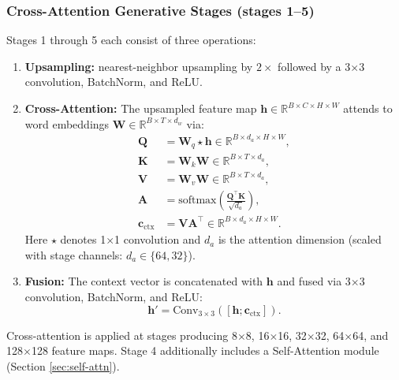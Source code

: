 \documentclass[conference]{IEEEtran}
\begin{document}
\subsubsection{Cross-Attention Generative Stages (stages 1--5)}
Stages 1 through 5 each consist of three operations:
\begin{enumerate}
    \item \textbf{Upsampling:} nearest-neighbor upsampling by $2\times$ followed by a 3$\times$3 convolution, BatchNorm, and ReLU.
    \item \textbf{Cross-Attention:} The upsampled feature map $\mathbf{h} \in \mathbb{R}^{B \times C \times H \times W}$ attends to word embeddings $\mathbf{W} \in \mathbb{R}^{B \times T \times d_w}$ via:
    \begin{align}
        \mathbf{Q} &= \mathbf{W}_q \star \mathbf{h} \in \mathbb{R}^{B \times d_a \times H \times W}, \\
        \mathbf{K} &= \mathbf{W}_k \mathbf{W} \in \mathbb{R}^{B \times T \times d_a}, \\
        \mathbf{V} &= \mathbf{W}_v \mathbf{W} \in \mathbb{R}^{B \times T \times d_a}, \\
        \mathbf{A} &= \text{softmax}\left( \frac{\mathbf{Q}^\top \mathbf{K}}{\sqrt{d_a}} \right), \\
        \mathbf{c}_{\text{ctx}} &= \mathbf{V} \mathbf{A}^\top \in \mathbb{R}^{B \times d_a \times H \times W}.
    \end{align}
    Here $\star$ denotes 1$\times$1 convolution and $d_a$ is the attention dimension (scaled with stage channels: $d_a \in \{64, 32\}$).
    \item \textbf{Fusion:} The context vector is concatenated with $\mathbf{h}$ and fused via 3$\times$3 convolution, BatchNorm, and ReLU:
    \begin{equation}
        \mathbf{h}' = \text{Conv}_{3\times3}\left( [\mathbf{h}; \mathbf{c}_{\text{ctx}}] \right).
    \end{equation}
\end{enumerate}

Cross-attention is applied at stages producing 8$\times$8, 16$\times$16, 32$\times$32, 64$\times$64, and 128$\times$128 feature maps. Stage 4 additionally includes a Self-Attention module (Section \ref{sec:self-attn}).
\end{document}

